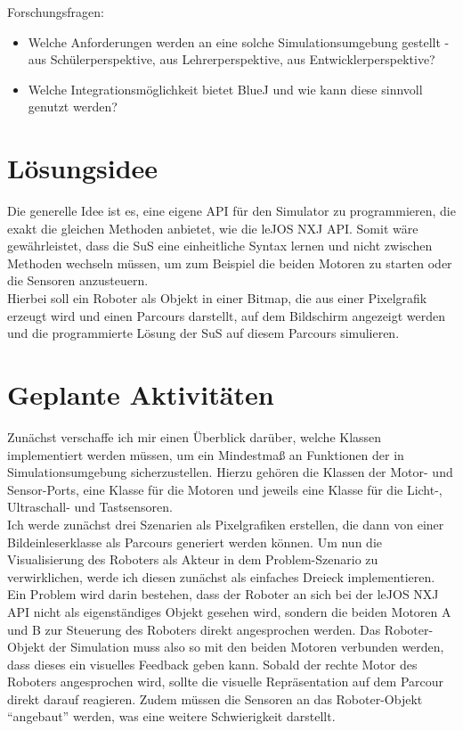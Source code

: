 \documentclass[paper=a4, pagesize, DIV=calc, BCOR=12.5mm, twoside=off, onecolumn=on, open = any, titlepage =on, parskip =half-, headsepline = on, footsepline = on, chapterprefix = on, appendixprefix = off, fontsize = 12pt, numbers = noenddot, abstract = on]{scrbook}
\numberwithin{equation}{chapter}
\begin{document}
Forschungsfragen:\\
\begin{itemize}
\item Welche Anforderungen werden an eine solche Simulationsumgebung gestellt - aus Schülerperspektive, aus Lehrerperspektive, aus Entwicklerperspektive?
\item Welche Integrationsmöglichkeit bietet BlueJ und wie kann diese sinnvoll genutzt werden?
\end{itemize}

\par \singlespacing
\section*{Lösungsidee}
\onehalfspacing
Die generelle Idee ist es, eine eigene API für den Simulator zu programmieren, die exakt die gleichen Methoden anbietet, wie die leJOS NXJ API. Somit wäre gewährleistet, dass die SuS eine einheitliche Syntax lernen und nicht zwischen Methoden wechseln müssen, um zum Beispiel die beiden Motoren zu starten oder die Sensoren anzusteuern.\\
Hierbei soll ein Roboter als Objekt in einer Bitmap, die aus einer Pixelgrafik erzeugt wird und einen Parcours darstellt, auf dem Bildschirm angezeigt werden und die programmierte Lösung der SuS auf diesem Parcours simulieren.\\


\par \singlespacing
\section*{Geplante Aktivitäten}
\onehalfspacing
Zunächst verschaffe ich mir einen Überblick darüber, welche Klassen implementiert werden müssen, um ein Mindestmaß an Funktionen der in Simulationsumgebung sicherzustellen. Hierzu gehören die Klassen der Motor- und Sensor-Ports, eine Klasse für die Motoren und jeweils eine Klasse für die Licht-, Ultraschall- und Tastsensoren.\\
Ich werde zunächst drei Szenarien als Pixelgrafiken erstellen, die dann von einer Bildeinleserklasse als Parcours generiert werden können. Um nun die Visualisierung des Roboters als Akteur in dem Problem-Szenario zu verwirklichen, werde ich diesen zunächst als einfaches Dreieck implementieren.\\
Ein Problem wird darin bestehen, dass der Roboter an sich bei der leJOS NXJ API nicht als eigenständiges Objekt gesehen wird, sondern die beiden Motoren A und B zur Steuerung des Roboters direkt angesprochen werden. Das Roboter-Objekt der Simulation muss also so mit den beiden Motoren verbunden werden, dass dieses ein visuelles Feedback geben kann. Sobald der rechte Motor des Roboters angesprochen wird, sollte die visuelle Repräsentation auf dem Parcour direkt darauf reagieren. Zudem müssen die Sensoren an das Roboter-Objekt "`angebaut"' werden, was eine weitere Schwierigkeit darstellt. 
\end{document}
